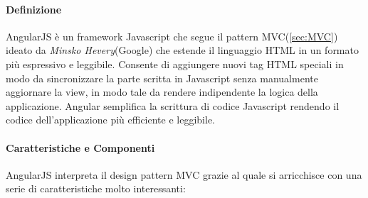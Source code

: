\paragraph*{Definizione}
AngularJS è un framework Javascript che segue il pattern MVC(\ref{sec:MVC}) ideato da \emph{Minsko Hevery}(Google) che estende il linguaggio HTML in un formato più espressivo e leggibile. Consente di aggiungere nuovi tag HTML speciali in modo da sincronizzare la parte scritta in Javascript senza manualmente aggiornare la view, in modo tale da rendere indipendente la logica della applicazione. Angular semplifica la scrittura di codice Javascript rendendo il codice dell'applicazione più efficiente e leggibile.
\paragraph*{Caratteristiche e Componenti}
AngularJS interpreta il design pattern MVC grazie al quale si arricchisce con una serie di caratteristiche molto interessanti:
